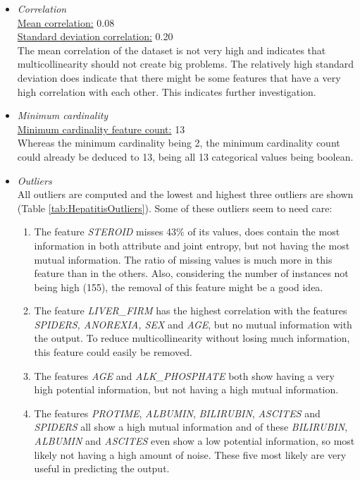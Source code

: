 \documentclass[10pt,a4paper]{article}
\begin{document}
	\begin{itemize}
		\item \textit{Correlation} \\
		\underline{Mean correlation:} 0.08 \\
		\underline{Standard deviation correlation:} 0.20 \\
		
		The mean correlation of the dataset is not very high and indicates that multicollinearity should not create big problems. The relatively high standard deviation does indicate that there might be some features that have a very high correlation with each other. This indicates further investigation.
		
		\item \textit{Minimum cardinality} \\
		\underline{Minimum cardinality feature count:} 13 \\
		
		Whereas the minimum cardinality being 2, the minimum cardinality count could already be deduced to 13, being all 13 categorical values being boolean.
		
		\item \textit{Outliers} \\
		
		All outliers are computed and the lowest and highest three outliers are shown (Table \ref{tab:HepatitisOutliers}). Some of these outliers seem to need care:
		\begin{enumerate}
			\item The feature \textit{STEROID} misses 43\% of its values, does contain the most information in both attribute and joint entropy, but not having the most mutual information. The ratio of missing values is much more in this feature than in the others. Also, considering the number of instances not being high (155), the removal of this feature might be a good idea.		
			\item The feature \textit{LIVER\_FIRM} has the highest correlation with the features \textit{SPIDERS, ANOREXIA, SEX} and \textit{AGE}, but no mutual information with the output. To reduce multicollinearity without losing much information, this feature could easily be removed.
			\item The features \textit{AGE} and \textit{ALK\_PHOSPHATE} both show having a very high potential information, but not having a high mutual information.
			\item The features \textit{PROTIME}, \textit{ALBUMIN}, \textit{BILIRUBIN}, \textit{ASCITES} and \textit{SPIDERS} all show a high mutual information and of these \textit{BILIRUBIN}, \textit{ALBUMIN} and \textit{ASCITES} even show a low potential information, so most likely not having a high amount of noise. These five most likely are very useful in predicting the output.
		\end{enumerate}	
	

\end{itemize}
\end{document}
